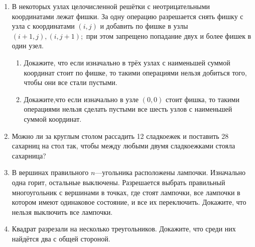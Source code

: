 \documentclass{article}
\begin{document}
\begin{enumerate}[label*=\protect\fbox{\arabic{enumi}}]
\item В некоторых узлах целочисленной решётки с неотрицательными координатами лежат фишки. За одну операцию разрешается снять фишку с узла с координатами $ (i, j) $ и добавить по фишке в узлы $ (i + 1, j), (i, j + 1); $ при этом запрещено попадание двух и более фишек в один узел.
\begin{enumerate} 
	\item Докажите, что если изначально в трёх узлах с наименьшей суммой координат стоит по фишке, то такими операциями нельзя добиться того, чтобы они все стали пустыми.
 	\item Докажите,что если изначально в узле $ (0,0) $ стоит фишка, то такими операциями нельзя сделать пустыми все шесть узлов с наименьшей суммой координат.
\end{enumerate} 
\item Можно ли за круглым столом рассадить 12 сладкоежек и поставить 28 сахарниц на стол так, чтобы между любыми двумя сладкоежками стояла сахарница?
\item В вершинах правильного $ n $—угольника расположены лампочки. Изначально одна горит, остальные выключены. Разрешается выбрать правильный многоугольник с вершинами в точках, где стоят лампочки, все лампочки в котором имеют одинаковое состояние, и все их переключить. Докажите, что нельзя выключить все лампочки.
\item Квадрат разрезали на несколько треугольников. Докажите, что среди них найдётся два с общей стороной.

\end{enumerate}
\end{document}
